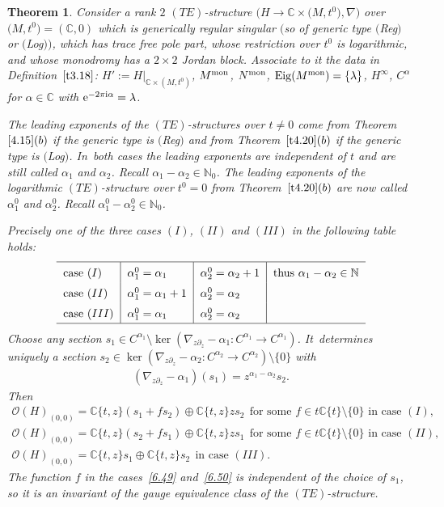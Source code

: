 \documentclass[pdftex]{sigma}%
\numberwithin{equation}{section}
\numberwithin{figure}{section}
\newcommand{\N}{{\mathbb N}}
\newcommand{\C}{{\mathbb C}}
\newcommand{\OO}{{\mathcal O}}
\newcommand{\paa}{\partial}
\newcommand{\nnn}{\nabla}
\DeclareMathOperator{\Eig}{Eig}
\newtheorem{Theorem}{Theorem}[section]
\begin{document}
\begin{Theorem}\label{t6.7}
Consider a rank $2$ $(TE)$-structure $\big(H\to\C\times \big(M,t^0\big),\nnn\big)$
over $\big(M,t^0\big)=(\C,0)$ which is generically regular singular
$($so of generic type $($Reg$)$ or $($Log$))$, which has trace free
pole part, whose restriction over $t^0$ is logarithmic,
and whose monodromy has a $2\times 2$ Jordan block.
Associate to it the data in Definition~$\ref{t3.18}$:
$H':=H|_{\C\times (M,t^0)}$, $M^{\rm mon}$, $N^{\rm mon}$,
$\Eig(M^{\rm mon})=\{\lambda\}$, $H^\infty$,
$C^\alpha$ for $\alpha\in\C$ with ${\rm e}^{-2\pi {\rm i}\alpha}=\lambda$.

The leading exponents of the $(TE)$-structures over $t\neq 0$
come from Theorem~$\ref{4.15}(b)$ if the generic type is
$($Reg$)$ and from Theorem~$\ref{t4.20}(b)$ if the generic type
is $($Log$)$. In~both cases the leading exponents are independent
of $t$ and are still called $\alpha_1$ and $\alpha_2$.
Recall $\alpha_1-\alpha_2\in\N_0$.
The leading exponents of the logarithmic $(TE)$-structure
over $t^0=0$ from Theorem~$\ref{t4.20}(b)$ are now called
$\alpha_1^0$ and $\alpha_2^0$.
Recall $\alpha_1^0-\alpha_2^0\in\N_0$.

Precisely one of the three cases $(I)$, $(II)$ and $(III)$
in the following table holds:
\[
\def\arraystretch{1.5}
\begin{tabular}{l|l|l|l}
\hline
case $(I)$ & $\alpha_1^0=\alpha_1$ &$ \alpha_2^0=\alpha_2+1$ &thus $\alpha_1-\alpha_2\in\N$
\\
case $(II)$ & $\alpha_1^0=\alpha_1+1$ & $\alpha_2^0=\alpha_2$
\\
case $(III)$ & $\alpha_1^0=\alpha_1$ & $\alpha_2^0=\alpha_2$
\\
\hline
\end{tabular}
\]
Choose any section
$s_1\in C^{\alpha_1}\setminus \ker(\nnn_{z\paa_z}-\alpha_1\colon
C^{\alpha_1}\to C^{\alpha_1})$. It~determines uniquely
a section
$s_2\in \ker(\nnn_{z\paa_z}-\alpha_2\colon C^{\alpha_2}\to
C^{\alpha_2})\setminus\{0\}$
with
\begin{gather}\label{6.48}
(\nnn_{z\paa_z}-\alpha_1)(s_1)=z^{\alpha_1-\alpha_2}s_2.
\end{gather}
Then
\begin{gather}
\OO(H)_{(0,0)}=\C\{t,z\}(s_1+fs_2)\oplus \C\{t,z\}zs_2\ \
\text{for some } f\in t\C\{t\}\setminus\{0\}
\text{ in case $(I)$,}\label{6.49}
\\
\OO(H)_{(0,0)}= \C\{t,z\}(s_2+fs_1)\oplus \C\{t,z\}zs_1\ \
\text{for some }f\in t\C\{t\}\setminus\{0\}
\text{ in case $(II)$,}\!\!\label{6.50}
\\
\OO(H)_{(0,0)}=\C\{t,z\}s_1 \oplus \C\{t,z\}s_2\ \
\text{in case $(III)$.}\label{6.51}
\end{gather}
The function $f$ in the cases~\eqref{6.49} and~\eqref{6.50}
is independent of the choice of $s_1$, so it is an
invariant of the gauge equivalence class of the
$(TE)$-structure.
\end{Theorem}
\end{document}

